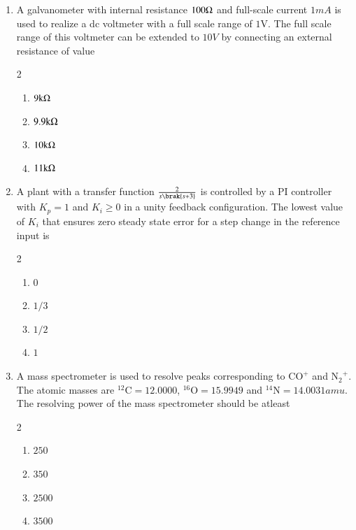 \documentclass[journal,12pt,onecolumn]{IEEEtran}
\theoremstyle{remark}
\begin{document}
\begin{enumerate}
\vspace{0.5cm}
\item A galvanometer with internal resistance $100\ohm$ and full-scale current $1mA$ is used to realize a dc voltmeter with a full scale range of $1\text{V}$. The full scale range of this voltmeter can be extended to $10V$ by connecting an external resistance of value \par \hfill{}
\begin{multicols}{2}
    \begin{enumerate}
        \item $9\text{k}\ohm$
        \item $9.9\text{k}\ohm$
        \item $10\text{k}\ohm$
        \item $11\text{k}\ohm$
\end{enumerate}
\end{multicols}

\vspace{0.5cm}
\item A plant with a transfer function $\frac{2}{s\brak{s+3}}$ is controlled by a PI controller with $K_p=1$ and $K_i\ge0$ in a unity feedback configuration. The lowest value of $K_i$ that ensures zero steady state error for a step change in the reference input is \par \hfill{}
\begin{multicols}{2}
    \begin{enumerate}
        \item $0$
        \item $1/3$
        \item $1/2$
        \item $1$
\end{enumerate}
\end{multicols}

\vspace{0.5cm}
\item A mass spectrometer is used to resolve peaks corresponding to $\mathrm{CO^{+}}$ and $\mathrm{N_2}^+$. The atomic masses are $^{12}\mathrm{C}=12.0000$, $^{16}\mathrm{O}=15.9949$ and $^{14}\mathrm{N}=14.0031 amu$. The resolving power of the mass spectrometer should be atleast \par \hfill{}
\begin{multicols}{2}
    \begin{enumerate}
        \item $250$ 
        \item $350$
        \item $2500$
        \item $3500$
\end{enumerate}
\end{multicols}


\end{enumerate}
\end{document}
